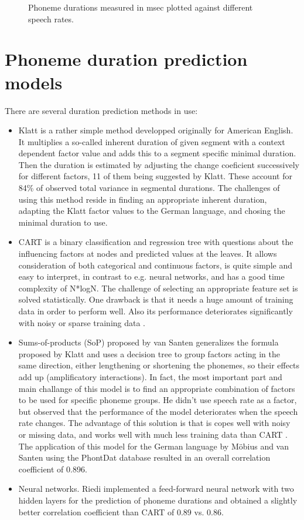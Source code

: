 \documentclass[a4paper]{scrreprt}
\begin{document}
\begin{figure}[htbp]
\begin{subfigure}[h]{0.48\textwidth}
	\label{fig:wsr}
	\end{subfigure}
\caption[Speech rate vs long vowel duration]{Phoneme durations measured in msec plotted against different speech rates.}
\label{fig:SR_corr}
\end{figure}

\chapter{Phoneme duration prediction models}
There are several duration prediction methods in use: 
\begin{itemize}
	\item Klatt \cite{Klatt1979} is a rather simple method developped originally for American English. It multiplies a so-called inherent duration of given segment with a context dependent factor value and adds this to a segment specific minimal duration. Then the duration is estimated by adjusting the change coeficient successively for different factors, 11 of them being suggested by Klatt. These account for 84\% of observed total variance in segmental durations. The challenges of using this method reside in finding an appropriate inherent duration, adapting the Klatt factor values to the German language, and chosing the minimal duration to use.
	\item CART \cite{Riley1992} is a binary classification and regression tree with questions about the influencing factors at nodes and predicted values at the leaves. It allows consideration of both categorical and continuous factors, is quite simple and easy to interpret, in contrast to e.g. neural networks, and has a good time complexity of N*logN. The challenge of selecting an appropriate feature set is solved statistically. One drawback is that it needs a huge amount of training data in order to perform well. Also its performance deteriorates significantly with noisy or sparse training data \cite{Moebius1996}.
	\item Sums-of-products (SoP) proposed by van Santen \cite{Santen1994} generalizes the formula proposed by Klatt and uses a decision tree to group factors acting in the same direction, either lengthening or shortening the phonemes, so their effects add up (amplificatory interactions). In fact, the most important part and main challange of this model is to find an appropriate combination of factors to be used for specific phoneme groups. He didn't use speech rate as a factor, but observed that the performance of the model deteriorates when the speech rate changes. The advantage of this solution is that is copes well with noisy or missing data, and works well with much less training data than CART \cite{Moebius1996}. The application of this model for the German language by Möbius and van Santen using the PhontDat database resulted in an overall correlation coefficient of 0.896.
	\item Neural networks. Riedi \cite{Riedi1995} implemented a feed-forward neural network with two hidden layers for the prediction of phoneme durations and obtained a slightly better correlation coefficient than CART of 0.89 vs. 0.86.
\end{itemize}
\end{document}
